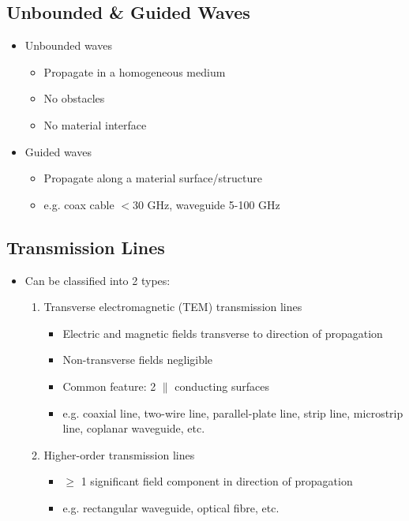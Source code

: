\documentclass[a4paper]{article}
\begin{document}
\subsection{Unbounded \& Guided Waves}
\begin{itemize}
    \item Unbounded waves
    \begin{itemize}[label=$\circ$]
        \item Propagate in a homogeneous medium
        \item No obstacles
        \item No material interface
    \end{itemize}
    \item Guided waves
    \begin{itemize}[label=$\circ$]
        \item Propagate along a material surface/structure
        \item e.g. coax cable $<$30 GHz, waveguide 5-100 GHz
    \end{itemize}
\end{itemize}

\subsection{Transmission Lines}
\begin{itemize}
    \item Can be classified into 2 types:
    \begin{enumerate}
        \item Transverse electromagnetic (TEM) transmission lines
        \begin{itemize}[label=\tiny$\blacksquare$]
            \item Electric and magnetic fields transverse to direction of propagation
            \item Non-transverse fields negligible
            \item Common feature: 2 $\parallel$ conducting surfaces
            \item e.g. coaxial line, two-wire line, parallel-plate line, strip line, microstrip line, coplanar waveguide, etc.
        \end{itemize}
        \item Higher-order transmission lines
        \begin{itemize}[label=\tiny$\blacksquare$]
            \item $\geq$ 1 significant field component in direction of propagation
            \item e.g. rectangular waveguide, optical fibre, etc.
        \end{itemize}
    \end{enumerate}
\end{itemize}
\end{document}
